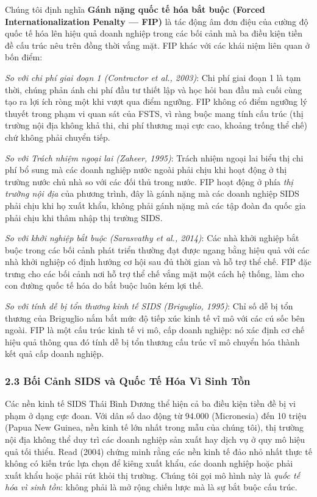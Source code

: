 \documentclass[12pt,a4paper]{article}
\begin{document}
Chúng tôi định nghĩa \textbf{Gánh nặng quốc tế hóa bắt buộc (Forced
Internationalization Penalty --- FIP)} là tác động âm đơn điệu của cường
độ quốc tế hóa lên hiệu quả doanh nghiệp trong các bối cảnh mà ba điều
kiện tiền đề cấu trúc nêu trên đồng thời vắng mặt. FIP khác với các khái
niệm liên quan ở bốn điểm:

\emph{So với chi phí giai đoạn 1 (Contractor et al., 2003)}: Chi phí
giai đoạn 1 là tạm thời, chúng phản ánh chi phí đầu tư thiết lập và học
hỏi ban đầu mà cuối cùng tạo ra lợi ích ròng một khi vượt qua điểm
ngưỡng. FIP không có điểm ngưỡng lý thuyết trong phạm vi quan sát của
FSTS, vì ràng buộc mang tính cấu trúc (thị trường nội địa không khả thi,
chi phí thương mại cực cao, khoảng trống thể chế) chứ không phải chuyển
tiếp.

\emph{So với Trách nhiệm ngoại lai (Zaheer, 1995)}: Trách nhiệm ngoại
lai biểu thị chi phí bổ sung mà các doanh nghiệp nước ngoài phải chịu
khi hoạt động ở thị trường nước chủ nhà so với các đối thủ trong nước.
FIP hoạt động ở phía \emph{thị trường nội địa} của phương trình, đây là
gánh nặng mà các doanh nghiệp SIDS phải chịu khi họ xuất khẩu, không
phải gánh nặng mà các tập đoàn đa quốc gia phải chịu khi thâm nhập thị
trường SIDS.

\emph{So với khởi nghiệp bắt buộc (Sarasvathy et al., 2014)}: Các nhà
khởi nghiệp bắt buộc trong các bối cảnh phát triển thường đạt được ngang
bằng hiệu quả với các nhà khởi nghiệp có định hướng cơ hội sau đủ thời
gian và hỗ trợ thể chế. FIP đặc trưng cho các bối cảnh nơi hỗ trợ thể
chế vắng mặt một cách hệ thống, làm cho con đường quốc tế hóa do bắt
buộc luôn kém lợi thế.

\emph{So với tính dễ bị tổn thương kinh tế SIDS (Briguglio, 1995)}: Chỉ
số dễ bị tổn thương của Briguglio nắm bắt mức độ tiếp xúc kinh tế vĩ mô
với các cú sốc bên ngoài. FIP là một cấu trúc kinh tế vi mô, cấp doanh
nghiệp: nó xác định cơ chế hiệu quả thông qua đó tính dễ bị tổn thương
cấu trúc vĩ mô chuyển hóa thành kết quả cấp doanh nghiệp.

\hypertarget{23-bux1ed1i-cux1ea3nh-sids-vuxe0-quux1ed1c-tux1ebf-huxf3a-vuxec-sinh-tux1ed3n}{%
\subsubsection{2.3 Bối Cảnh SIDS và Quốc Tế Hóa Vì Sinh
Tồn}\label{23-bux1ed1i-cux1ea3nh-sids-vuxe0-quux1ed1c-tux1ebf-huxf3a-vuxec-sinh-tux1ed3n}}

Các nền kinh tế SIDS Thái Bình Dương thể hiện cả ba điều kiện tiền đề bị
vi phạm ở dạng cực đoan. Với dân số dao động từ 94.000 (Micronesia) đến
10 triệu (Papua New Guinea, nền kinh tế lớn nhất trong mẫu của chúng
tôi), thị trường nội địa không thể duy trì các doanh nghiệp sản xuất hay
dịch vụ ở quy mô hiệu quả tối thiểu. Read (2004) chứng minh rằng các nền
kinh tế đảo nhỏ nhất thực tế không có kiến trúc lựa chọn để kiêng xuất
khẩu, các doanh nghiệp hoặc phải xuất khẩu hoặc phải rút khỏi thị
trường. Chúng tôi gọi mô hình này là \emph{quốc tế hóa vì sinh tồn}:
không phải là mở rộng chiến lược mà là sự bắt buộc cấu trúc.
\end{document}

